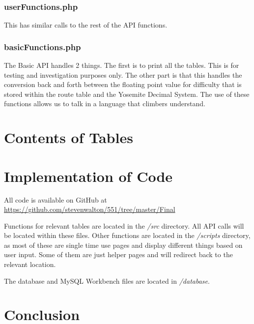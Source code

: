 \documentclass[12pt,letter]{article}
\begin{document}
\subsubsection{userFunctions.php}
This has similar calls to the rest of the API functions. 

\subsubsection{basicFunctions.php}
The Basic API handles 2 things. The first is to print all the tables. This is
for testing and investigation purposes only. The other part is that this handles
the conversion back and forth between the floating point value for difficulty
that is stored within the route table and the Yosemite Decimal System. The use
of these functions allows us to talk in a language that climbers understand.


\section{Contents of Tables}

\section{Implementation of Code}
All code is available on GitHub at
\href{https://github.com/stevenwalton/551/tree/master/Final}{https://github.com/stevenwalton/551/tree/master/Final}

Functions for relevant tables are located in the \textit{/src} directory. All
API calls will be located within these files. Other
functions are located in the \textit{/scripts} directory, as most of these are
single time use pages and display different things based on user input. Some of
them are just helper pages and will redirect back to the relevant location.

The database and MySQL Workbench files are located in \textit{/database}.

\section{Conclusion}
\end{document}
